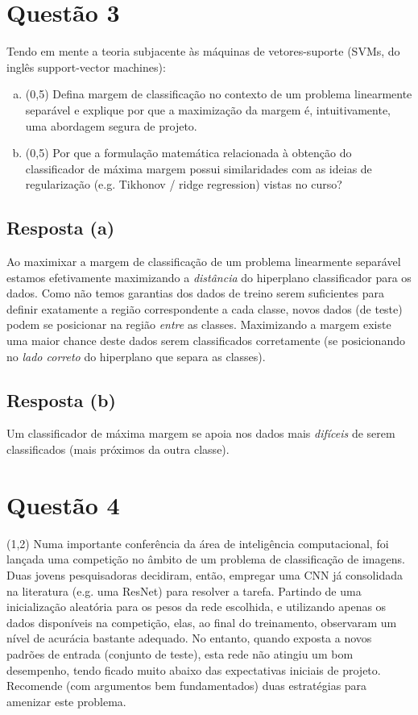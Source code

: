 \documentclass[final,3p]{elsarticle}
\numberwithin{equation}{section}
\begin{document}
\section{Questão 3}

    Tendo em mente a teoria subjacente às máquinas de vetores-suporte (SVMs, do inglês support-vector machines):

    \begin{enumerate}[(a)]
        \item (0,5) Defina margem de classificação no contexto de um problema linearmente separável e explique por que a maximização da margem é, intuitivamente, uma abordagem segura de projeto.
        \item (0,5) Por que a formulação matemática relacionada à obtenção do classificador de máxima margem possui similaridades com as ideias de regularização (e.g. Tikhonov / ridge regression) vistas no curso?
    \end{enumerate}

    \subsection{Resposta \textbf{(a)}}

        Ao maximixar a margem de classificação de um problema linearmente separável estamos efetivamente maximizando a \emph{distância} do hiperplano classificador para os dados. Como não temos garantias dos dados de treino serem suficientes para definir exatamente a região correspondente a cada classe, novos dados (de teste) podem se posicionar na região \emph{entre} as classes. Maximizando a margem existe uma maior chance deste dados serem classificados corretamente (se posicionando no \emph{lado correto} do hiperplano que separa as classes).

    \subsection{Resposta \textbf{(b)}}

        Um classificador de máxima margem se apoia nos dados mais \emph{difíceis} de serem classificados (mais próximos da outra classe).

\section{Questão 4}

    (1,2) Numa importante conferência da área de inteligência computacional, foi lançada uma competição no âmbito de um problema de classificação de imagens. Duas jovens pesquisadoras decidiram, então, empregar uma CNN já consolidada na literatura (e.g. uma ResNet) para resolver a tarefa. Partindo de uma inicialização aleatória para os pesos da rede escolhida, e utilizando apenas os dados disponíveis na competição, elas, ao final do treinamento, observaram um nível de acurácia bastante adequado. No entanto, quando exposta a novos padrões de entrada (conjunto de teste), esta rede não atingiu um bom desempenho, tendo ficado muito abaixo das expectativas iniciais de projeto. Recomende (com argumentos bem fundamentados) duas estratégias para amenizar este problema.
\end{document}
